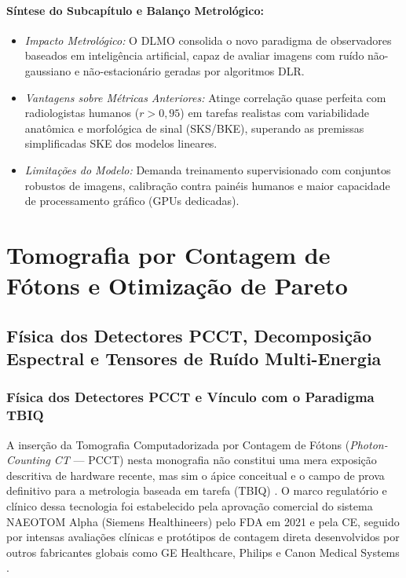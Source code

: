\documentclass[
  12pt,
  a4paper,
  oneside
]{report}
\begin{document}
\paragraph{Síntese do Subcapítulo e Balanço Metrológico:}
\begin{itemize}
  \item \emph{Impacto Metrológico:} O DLMO consolida o novo paradigma de observadores baseados em inteligência artificial, capaz de avaliar imagens com ruído não-gaussiano e não-estacionário geradas por algoritmos DLR.
  \item \emph{Vantagens sobre Métricas Anteriores:} Atinge correlação quase perfeita com radiologistas humanos ($r > 0{,}95$) em tarefas realistas com variabilidade anatômica e morfológica de sinal (SKS/BKE), superando as premissas simplificadas SKE dos modelos lineares.
  \item \emph{Limitações do Modelo:} Demanda treinamento supervisionado com conjuntos robustos de imagens, calibração contra painéis humanos e maior capacidade de processamento gráfico (GPUs dedicadas).
\end{itemize}

\section{Tomografia por Contagem de Fótons e Otimização de Pareto}
\label{sec:pcct_pareto_completo}

\subsection{Física dos Detectores PCCT, Decomposição Espectral e Tensores de Ruído Multi-Energia}
\label{subsec:pcct_fisica_detectores_decomposicao_tensor}

\subsubsection{Física dos Detectores PCCT e Vínculo com o Paradigma TBIQ}
A inserção da Tomografia Computadorizada por Contagem de Fótons (\emph{Photon-Counting CT} --- PCCT) nesta monografia não constitui uma mera exposição descritiva de hardware recente, mas sim o ápice conceitual e o campo de prova definitivo para a metrologia baseada em tarefa (TBIQ) \cite{willemink2018, rajendran2021, pimenta2026}. O marco regulatório e clínico dessa tecnologia foi estabelecido pela aprovação comercial do sistema NAEOTOM Alpha (Siemens Healthineers) pelo FDA em 2021 e pela CE, seguido por intensas avaliações clínicas e protótipos de contagem direta desenvolvidos por outros fabricantes globais como GE Healthcare, Philips e Canon Medical Systems \cite{rajendran2021, mccollough2026}.
\end{document}
